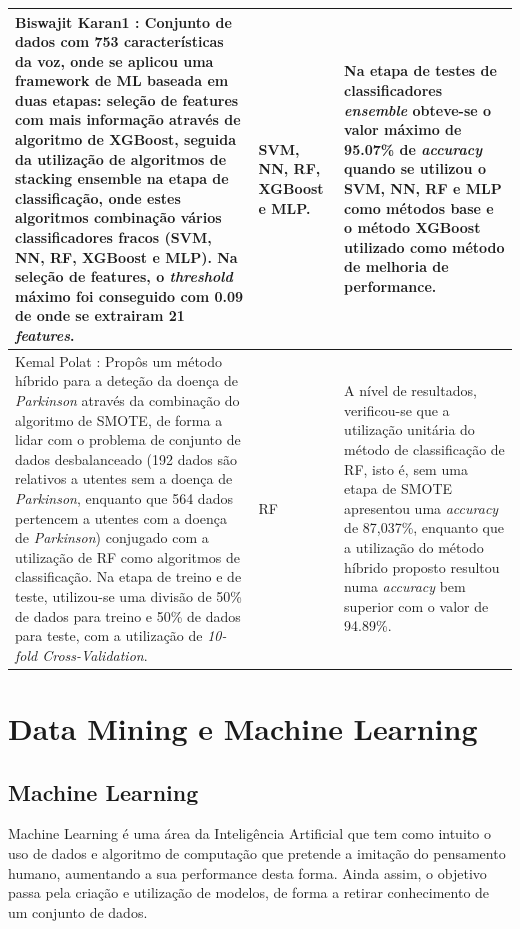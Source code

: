 \documentclass[12pt,a4paper,twoside]{report}
\begin{document}
{\begin{longtable}{|p{6cm}|p{4cm}|p{6cm}|}
Biswajit Karan1 \cite{Karan2023}:
Conjunto de dados com 753 características da voz, onde se aplicou
uma framework de \gls{ML} baseada em duas etapas:
seleção de features com mais informação através de
algoritmo de XGBoost, seguida da utilização de algoritmos
de stacking ensemble na etapa de classificação, onde estes algoritmos
combinação vários classificadores fracos (\Gls{SVM}, \gls{NN}, \gls{RF}, \gls{XGBoost} e \Gls{MLP}).
Na seleção de features, o \textit{threshold} máximo foi conseguido com 0.09
de onde se extrairam 21 \textit{features}.
& \Gls{SVM}, \gls{NN}, \gls{RF}, \gls{XGBoost} e \Gls{MLP}.
& Na etapa de testes de classificadores \textit{ensemble}
obteve-se o valor máximo de 95.07\% de \textit{accuracy}
quando se utilizou o \Gls{SVM}, \gls{NN}, \gls{RF} e \Gls{MLP}
como métodos base e o método \gls{XGBoost} utilizado como método
de melhoria de performance. \\ \hline

Kemal Polat  \cite{Polat2019} :
Propôs um método híbrido para a deteção da doença de \textit{Parkinson} através da combinação do algoritmo de \gls{SMOTE}, de forma a lidar com o problema de conjunto de dados desbalanceado (192 dados são relativos a utentes sem a doença de \textit{Parkinson}, enquanto que 564 dados pertencem a utentes com a doença de \textit{Parkinson}) conjugado com a utilização de \gls{RF} como algoritmos de classificação. Na etapa de treino e de teste, utilizou-se uma divisão de 50\% de dados para treino e 50\% de dados para teste, com a utilização de \textit{10-fold Cross-Validation}. 
& \gls{RF}
& A nível de resultados, verificou-se que a utilização unitária do método de classificação de \gls{RF}, isto é, sem uma etapa de \gls{SMOTE} apresentou uma \textit{accuracy} de 87,037\%, enquanto que a utilização do método híbrido proposto resultou numa \textit{accuracy} bem superior com o valor de 94.89\%. \\ \hline
\end{longtable}


\chapter{Data Mining e Machine Learning}

\section{Machine Learning}
Machine Learning é uma área da Inteligência Artificial que tem como intuito o uso de dados e algoritmo de computação que pretende a imitação do pensamento humano, aumentando a sua performance desta forma\cite{books/daglib/0033642}. Ainda assim, o objetivo passa pela criação e utilização de modelos, de forma a retirar conhecimento de um conjunto de dados\cite{Grus15}.

}
\end{document}
